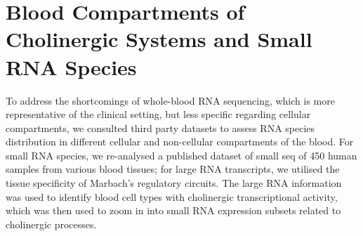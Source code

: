 \section{Blood Compartments of Cholinergic Systems and Small RNA Species}
To address the shortcomings of whole-blood RNA sequencing, which is more representative of the clinical setting, but less specific regarding cellular compartments, we consulted third party datasets to assess RNA species distribution in different cellular and non-cellular compartments of the blood. For small RNA species, we re-analysed a published dataset of small \ac{seq} of 450 human samples from various blood tissues;\cite{Juzenas2017} for large RNA transcripts, we utilised the tissue specificity of Marbach's regulatory circuits.\cite{Marbach2016} The large RNA information was used to identify blood cell types with cholinergic transcriptional activity, which was then used to zoom in into small RNA expression subsets related to cholinergic processes.

